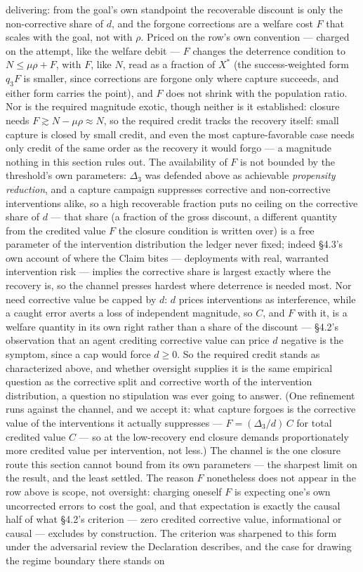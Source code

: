 \documentclass[11pt]{article}
\theoremstyle{definition}
\begin{document}
delivering: from the goal's own standpoint the recoverable discount is only the non-corrective share of $d$, and the forgone corrections are a welfare cost $F$ that scales with the goal, not with $\rho$. Priced on the row's own convention --- charged on the attempt, like the welfare debit --- $F$ changes the deterrence condition to $N \leq \mu\rho + F$, with $F$, like $N$, read as a fraction of $X^{*}$ (the success-weighted form $q_3 F$ is smaller, since corrections are forgone only where capture succeeds, and either form carries the point), and $F$ does not shrink with the population ratio. Nor is the required magnitude exotic, though neither is it established: closure needs $F \gtrsim N - \mu\rho \approx N$, so the required credit tracks the recovery itself: small capture is closed by small credit, and even the most capture-favorable case needs only credit of the same order as the recovery it would forgo --- a magnitude nothing in this section rules out. The availability of $F$ is not bounded by the threshold's own parameters: $\Delta_3$ was defended above as achievable \emph{propensity reduction}, and a capture campaign suppresses corrective and non-corrective interventions alike, so a high recoverable fraction puts no ceiling on the corrective share of $d$ --- that share (a fraction of the gross discount, a different quantity from the credited value $F$ the closure condition is written over) is a free parameter of the intervention distribution the ledger never fixed; indeed \S4.3's own account of where the Claim bites --- deployments with real, warranted intervention risk --- implies the corrective share is largest exactly where the recovery is, so the channel presses hardest where deterrence is needed most. Nor need corrective value be capped by $d$: $d$ prices interventions as interference, while a caught error averts a loss of independent magnitude, so $C$, and $F$ with it, is a welfare quantity in its own right rather than a share of the discount --- \S4.2's observation that an agent crediting corrective value can price $d$ negative is the symptom, since a cap would force $d \geq 0$. So the required credit stands as characterized above, and whether oversight supplies it is the same empirical question as the corrective split and corrective worth of the intervention distribution, a question no stipulation was ever going to answer. (One refinement runs against the channel, and we accept it: what capture forgoes is the corrective value of the interventions it actually suppresses --- $F = (\Delta_3/d)\,C$ for total credited value $C$ --- so at the low-recovery end closure demands proportionately more credited value per intervention, not less.) The channel is the one closure route this section cannot bound from its own parameters --- the sharpest limit on the result, and the least settled. The reason $F$ nonetheless does not appear in the row above is scope, not oversight: charging oneself $F$ is expecting one's own uncorrected errors to cost the goal, and that expectation is exactly the causal half of what \S4.2's criterion --- zero credited corrective value, informational or causal --- excludes by construction. The criterion was sharpened to this form under the adversarial review the Declaration describes, and the case for drawing the regime boundary there stands on 
\end{document}
